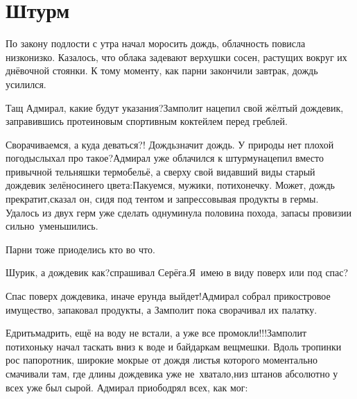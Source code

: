 \chapter{Штурм}
\vepsianrose

По закону подлости с утра начал моросить дождь, облачность повисла низко\sdash низко. Казалось, что облака задевают верхушки сосен, растущих вокруг их днёвочной стоянки. К тому моменту, как парни закончили завтрак, дождь усилился.

\diagdash Тащ Адмирал, какие будут указания?\mdash Замполит нацепил свой жёлтый дождевик, заправившись протеиновым спортивным коктейлем перед греблей.


\diagdash Сворачиваемся, а куда деваться?! Дождь\mdash значит дождь. У природы нет плохой погоды\mdash слыхал про такое?\mdash Адмирал уже облачился к штурму\mdash нацепил вместо привычной тельняшки термобельё, а сверху свой видавший виды старый дождевик зелёно\sdash синего цвета:\mdash Пакуемся, мужики, потихонечку. Может, дождь прекратит,\mdash сказал он, сидя под тентом и запрессовывая продукты в гермы. Удалось из двух герм уже сделать одну\mdash минула половина похода, запасы провизии сильно~уменьшились.

Парни тоже приоделись кто во что.

\diagdash Шурик, а дождевик как?\mdash спрашивал Серёга.\mdash Я~имею в виду поверх или под спас?

\diagdash Спас поверх дождевика, иначе ерунда выйдет!\mdash Адмирал собрал прикостровое имущество, запаковал продукты, а Замполит пока сворачивал их палатку.

\diagdash Едрить\sdash мадрить, ещё на воду не встали, а уже все промокли!!!\mdash Замполит потихоньку начал таскать вниз к воде и байдаркам вещмешки. Вдоль тропинки рос папоротник, широкие мокрые от дождя листья которого моментально смачивали там, где длины дождевика уже не~хватало,\mdash низ штанов абсолютно у всех уже был сырой. Адмирал приободрял всех, как мог:

